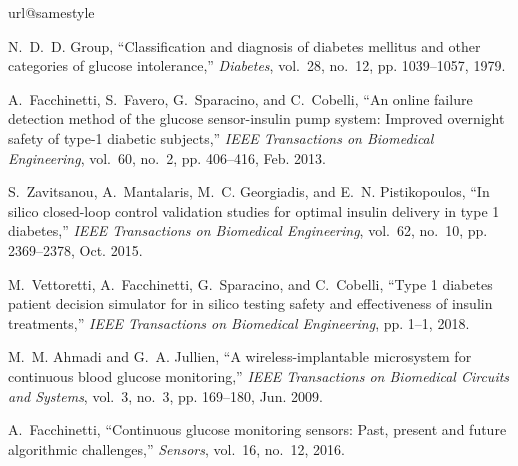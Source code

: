 \documentclass[a4paper, 10 pt, twocolumn]{IEEEtran}
\begin{document}

%
\begin{thebibliography}{10}
\providecommand{\url}[1]{#1}
\csname url@samestyle\endcsname
\providecommand{\newblock}{\relax}
\providecommand{\bibinfo}[2]{#2}
\providecommand{\BIBentrySTDinterwordspacing}{\spaceskip=0pt\relax}
\providecommand{\BIBentryALTinterwordstretchfactor}{4}
\providecommand{\BIBentryALTinterwordspacing}{\spaceskip=\fontdimen2\font plus
\BIBentryALTinterwordstretchfactor\fontdimen3\font minus
  \fontdimen4\font\relax}
\providecommand{\BIBforeignlanguage}[2]{{%
\expandafter\ifx\csname l@#1\endcsname\relax
\typeout{** WARNING: IEEEtran.bst: No hyphenation pattern has been}%
\typeout{** loaded for the language `#1'. Using the pattern for}%
\typeout{** the default language instead.}%
\else
\language=\csname l@#1\endcsname
\fi
#2}}
\providecommand{\BIBdecl}{\relax}
\BIBdecl

N.~D.~D. Group, ``Classification and diagnosis of diabetes mellitus and other
  categories of glucose intolerance,'' \emph{Diabetes}, vol.~28, no.~12, pp.
  1039--1057, 1979.

A.~Facchinetti, S.~Favero, G.~Sparacino, and C.~Cobelli, ``An online failure
  detection method of the glucose sensor-insulin pump system: Improved
  overnight safety of type-1 diabetic subjects,'' \emph{IEEE Transactions on
  Biomedical Engineering}, vol.~60, no.~2, pp. 406--416, Feb. 2013.

S.~Zavitsanou, A.~Mantalaris, M.~C. Georgiadis, and E.~N. Pistikopoulos, ``In
  silico closed-loop control validation studies for optimal insulin delivery in
  type 1 diabetes,'' \emph{IEEE Transactions on Biomedical Engineering},
  vol.~62, no.~10, pp. 2369--2378, Oct. 2015.

M.~Vettoretti, A.~Facchinetti, G.~Sparacino, and C.~Cobelli, ``Type 1 diabetes
  patient decision simulator for in silico testing safety and effectiveness of
  insulin treatments,'' \emph{IEEE Transactions on Biomedical Engineering}, pp.
  1--1, 2018.

M.~M. Ahmadi and G.~A. Jullien, ``A wireless-implantable microsystem for
  continuous blood glucose monitoring,'' \emph{IEEE Transactions on Biomedical
  Circuits and Systems}, vol.~3, no.~3, pp. 169--180, Jun. 2009.

A.~Facchinetti, ``Continuous glucose monitoring sensors: Past, present and
  future algorithmic challenges,'' \emph{Sensors}, vol.~16, no.~12, 2016.


\end{thebibliography}
\end{document}
